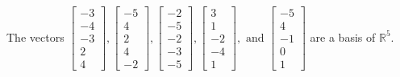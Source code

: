 \begin{exercise}
\begin{exerciseStatement}
  \end{exerciseStatement}
  \begin{exerciseAnswer}
   The vectors \(\left[\begin{array}{r}
-3 \\
-4 \\
-3 \\
2 \\
4
\end{array}\right] , \left[\begin{array}{r}
-5 \\
4 \\
2 \\
4 \\
-2
\end{array}\right] , \left[\begin{array}{r}
-2 \\
-5 \\
-2 \\
-3 \\
-5
\end{array}\right] , \left[\begin{array}{r}
3 \\
1 \\
-2 \\
-4 \\
1
\end{array}\right] , \text{ and } \left[\begin{array}{r}
-5 \\
4 \\
-1 \\
0 \\
1
\end{array}\right]\) 
  	 are  a basis of \(\mathbb{R}^5\).
  


  \end{exerciseAnswer}
\end{exercise}